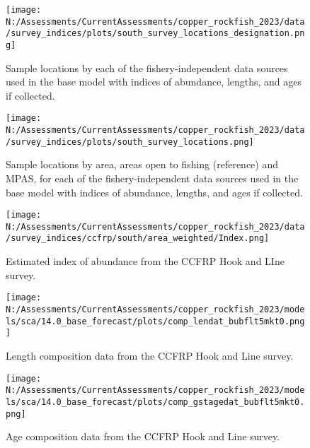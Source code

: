 \documentclass[11pt,
  english,
  letterpaper,
]{article}
\begin{document}
\pagebreak

\begin{figure}
\centering
\texttt{[image: N:/Assessments/CurrentAssessments/copper\_rockfish\_2023/data/survey\_indices/plots/south\_survey\_locations\_designation.png]}
\caption{Sample locations by each of the fishery-independent data sources used in the base model with indices of abundance, lengths, and ages if collected.\label{fig:survey-locations}}
\end{figure}

\pagebreak

\begin{figure}
\centering
\texttt{[image: N:/Assessments/CurrentAssessments/copper\_rockfish\_2023/data/survey\_indices/plots/south\_survey\_locations.png]}
\caption{Sample locations by area, areas open to fishing (reference) and MPAS, for each of the fishery-independent data sources used in the base model with indices of abundance, lengths, and ages if collected.\label{fig:ref-mpa}}
\end{figure}

\pagebreak

\begin{figure}
\centering
\texttt{[image: N:/Assessments/CurrentAssessments/copper\_rockfish\_2023/data/survey\_indices/ccfrp/south/area\_weighted/Index.png]}
\caption{Estimated index of abundance from the CCFRP Hook and LIne survey.\label{fig:ccfrp-index-main}}
\end{figure}

\pagebreak

\begin{figure}
\centering
\texttt{[image: N:/Assessments/CurrentAssessments/copper\_rockfish\_2023/models/sca/14.0\_base\_forecast/plots/comp\_lendat\_bubflt5mkt0.png]}
\caption{Length composition data from the CCFRP Hook and Line survey.\label{fig:ccfrp-len-data}}
\end{figure}

\pagebreak

\begin{figure}
\centering
\texttt{[image: N:/Assessments/CurrentAssessments/copper\_rockfish\_2023/models/sca/14.0\_base\_forecast/plots/comp\_gstagedat\_bubflt5mkt0.png]}
\caption{Age composition data from the CCFRP Hook and Line survey.\label{fig:ccfrp-age-data}}
\end{figure}
\end{document}

